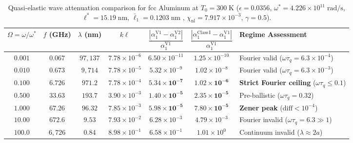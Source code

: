 \begin{table}[htbp]
  \centering
  \caption{Quasi-elastic wave attenuation comparison for fcc Aluminum at $T_0 = 300\;\mathrm{K}$ ($\epsilon = 0.0356$, $\omega^* = 4.226\times 10^{11}\;\mathrm{rad/s}$, $\ell^* = 15.19\;\mathrm{nm}$, $\bar{\ell}_1 = 0.1203\;\mathrm{nm}$ \cite{Lazar2022}, $\chi_{\mathrm{nl}} = 7.917\times 10^{-3}$, $\gamma = 0.5$).}\label{tab:al_damping}
  \vspace{4pt}
  {\footnotesize
  \begin{tabular}{@{}ccccccp{3.9cm}@{}}
    \toprule
    $\Omega = \omega/\omega^*$ & $f$ (GHz) & $\lambda$ (nm) & $k\ell$ & $\dfrac{|\alpha_1^{\mathrm{V1}} - \alpha_1^{\mathrm{V2}}|}{\alpha_1^{\mathrm{V1}}}$ & $\dfrac{|\alpha_1^{\mathrm{Class\,I}} - \alpha_1^{\mathrm{V1}}|}{\alpha_1^{\mathrm{V1}}}$ & \textbf{Regime Assessment} \\
    \midrule
    $0.001$ & $0.067$ & $97,137$ & $7.78 \times 10^{-6}$ & $6.50 \times 10^{-11}$ & $1.25 \times 10^{-10}$ & Fourier valid ($\omega\tau_q = 6.3\times 10^{-4}$) \\
    $0.010$ & $0.673$ & $9,714$ & $7.78 \times 10^{-5}$ & $5.32 \times 10^{-9}$ & $1.02 \times 10^{-8}$ & Fourier valid ($\omega\tau_q = 6.3\times 10^{-3}$) \\
    $0.100$ & $6.726$ & $971.2$ & $7.78 \times 10^{-4}$ & $\mathbf{5.34 \times 10^{-7}}$ & $\mathbf{1.02 \times 10^{-6}}$ & \textbf{Strict Fourier ceiling} ($\omega\tau_q \le 0.1$) \\
    $0.500$ & $33.63$ & $193.7$ & $3.90 \times 10^{-3}$ & $\mathbf{1.40 \times 10^{-5}}$ & $\mathbf{2.35 \times 10^{-5}}$ & Pre-ballistic ($\omega\tau_q = 0.32$) \\
    $1.000$ & $67.26$ & $96.32$ & $7.85 \times 10^{-3}$ & $\mathbf{5.98 \times 10^{-5}}$ & $\mathbf{7.80 \times 10^{-5}}$ & \textbf{Zener peak} ($\text{diff} < 10^{-4}$) \\
    $10.00$ & $672.6$ & $9.53$ & $7.93 \times 10^{-2}$ & $6.28 \times 10^{-3}$ & $4.79 \times 10^{-3}$ & Fourier invalid ($\omega\tau_q = 6.3 \gg 1$) \\
    $100.0$ & $6,726$ & $0.84$ & $8.98 \times 10^{-1}$ & $6.58 \times 10^{-1}$ & $1.01 \times 10^{0}$ & Continuum invalid ($\lambda \approx 2a$) \\
    \bottomrule
  \end{tabular}}
\end{table}

